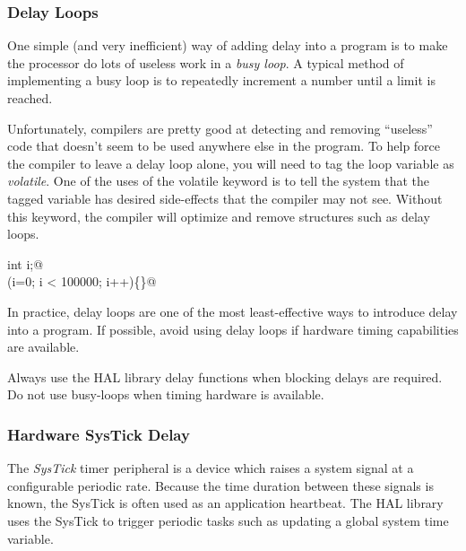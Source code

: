 \documentclass[11pt,fleqn]{book} %
\begin{document}
\subsubsection{Delay Loops}
One simple (and very inefficient) way of adding delay into a program is to make the processor do lots of useless work in a \textit{busy loop}. A typical method of implementing a busy loop is to repeatedly increment a number until a limit is reached.

Unfortunately, compilers are pretty good at detecting and removing ``useless'' code that doesn't seem to be used anywhere else in the program. To help force the compiler to leave a delay loop alone, you will need to tag the loop variable as \textit{volatile}. One of the uses of the volatile keyword is to tell the system that the tagged variable has desired side-effects that the compiler may not see. Without this keyword, the compiler will optimize and remove structures such as delay loops.


\smallskip
\colorbox{gray!20!white}{
    \centering
    \parbox{\linewidth-2\fboxsep}{
        \lstinline@volatile int i;@ \\
        \lstinline@for(i=0; i < 100000; i++)\{\}@ 
    }
}
\smallskip

In practice, delay loops are one of the most least-effective ways to introduce delay into a program. If possible, avoid using delay loops if hardware timing capabilities are available. 

\begin{warning}
    Always use the HAL library delay functions when blocking delays are required. Do not use busy-loops when timing hardware is available.
\end{warning}

\subsubsection{Hardware SysTick Delay}

The \textit{SysTick} timer peripheral is a device which raises a system signal at a configurable periodic rate. Because the time duration between these signals is known, the SysTick is often used as an application heartbeat. The HAL library uses the SysTick to trigger periodic tasks such as updating a global system time variable. 
\end{document}
